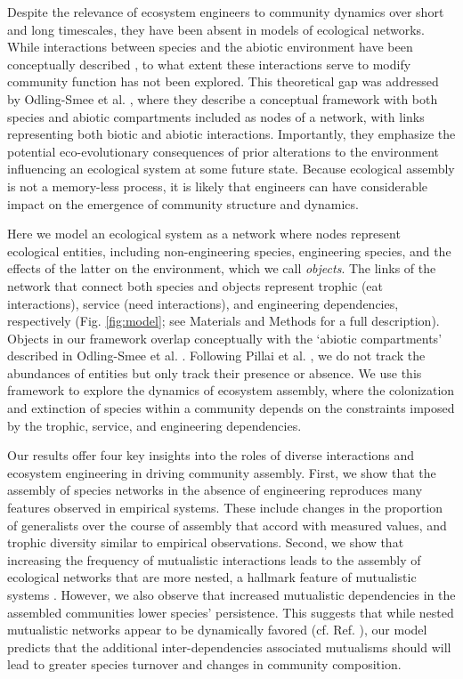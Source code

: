 \documentclass[9pt,twocolumn,twoside]{pnas-new}
\begin{document}
Despite the relevance of ecosystem engineers to community dynamics over short and long timescales, they have been absent in models of ecological networks.
While interactions between species and the abiotic environment have been conceptually described \cite{Olff2009,Getz2011}, to what extent these interactions serve to modify community function has not been explored.
This theoretical gap was addressed by Odling-Smee et al. \cite{OdlingSmee2013}, where they describe a conceptual framework with both species and abiotic compartments included as nodes of a network, with links representing both biotic and abiotic interactions.
Importantly, they emphasize the potential eco-evolutionary consequences of prior alterations to the environment influencing an ecological system at some future state.
Because ecological assembly is not a memory-less process, it is likely that engineers can have considerable impact on the emergence of community structure and dynamics.

Here we model an ecological system as a network where nodes represent ecological entities, including non-engineering species, engineering species, and the effects of the latter on the environment, which we call \emph{objects}.
The links of the network that connect both species and objects represent trophic (eat interactions), service (need interactions), and engineering dependencies, respectively (Fig. \ref{fig:model}; see Materials and Methods for a full description).
Objects in our framework overlap conceptually with the `abiotic compartments' described in Odling-Smee et al. \cite{OdlingSmee2013}.
Following Pillai et al. \cite{Pillai2011}, we do not track the abundances of entities but only track their presence or absence.
We use this framework to explore the dynamics of ecosystem assembly, where the colonization and extinction of species within a community depends on the constraints imposed by the trophic, service, and engineering dependencies.

Our results offer four key insights into the roles of diverse interactions and ecosystem engineering in driving community assembly.
First, we show that the assembly of species networks in the absence of engineering reproduces many features observed in empirical systems.
These include changes in the proportion of generalists over the course of assembly that accord with measured values, and trophic diversity similar to empirical observations. %
Second, we show that increasing the frequency of mutualistic interactions leads to the assembly of ecological networks that are more nested, a hallmark feature of mutualistic systems \cite{Bascompte2003}.
However, we also observe that increased mutualistic dependencies in the assembled communities lower species' persistence.
This suggests that while nested mutualistic networks appear to be dynamically favored (cf. Ref. ), our model predicts that the additional inter-dependencies associated mutualisms should will lead to greater species turnover and changes in community composition.
\end{document}
